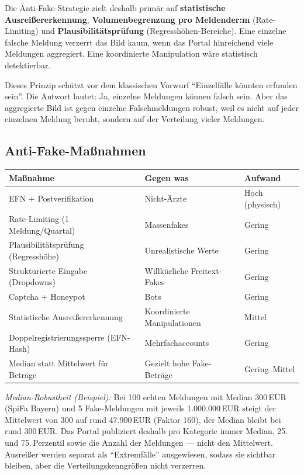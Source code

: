 \documentclass{umbruch-position}
\begin{document}
Die Anti-Fake-Strategie zielt deshalb primär auf \textbf{statistische Ausreißererkennung}, \textbf{Volumenbegrenzung pro Meldender:m} (Rate-Limiting) und \textbf{Plausibilitätsprüfung} (Regresshöhen-Bereiche). Eine einzelne falsche Meldung verzerrt das Bild kaum, wenn das Portal hinreichend viele Meldungen aggregiert. Eine koordinierte Manipulation wäre statistisch detektierbar.

Dieses Prinzip schützt vor dem klassischen Vorwurf ``Einzelfälle könnten erfunden sein''. Die Antwort lautet: Ja, einzelne Meldungen können falsch sein. Aber das aggregierte Bild ist gegen einzelne Falschmeldungen robust, weil es nicht auf jeder einzelnen Meldung beruht, sondern auf der Verteilung vieler Meldungen.

\subsection{Anti-Fake-Maßnahmen}

{\small
\begin{tabularx}{\textwidth}{X X X}
\toprule
\textbf{Maßnahme} & \textbf{Gegen was} & \textbf{Aufwand} \\
\midrule
EFN + Postverifikation & Nicht-Ärzte & Hoch (physisch) \\
Rate-Limiting (1 Meldung/Quartal) & Massenfakes & Gering \\
Plausibilitätsprüfung (Regresshöhe) & Unrealistische Werte & Gering \\
Strukturierte Eingabe (Dropdowns) & Willkürliche Freitext-Fakes & Gering \\
Captcha + Honeypot & Bots & Gering \\
Statistische Ausreißererkennung & Koordinierte Manipulationen & Mittel \\
Doppelregistrierungssperre (EFN-Hash) & Mehrfachaccounts & Gering \\
Median statt Mittelwert für Beträge & Gezielt hohe Fake-Beträge & Gering--Mittel \\
\bottomrule
\end{tabularx}
}

\textit{Median-Robustheit (Beispiel):} Bei 100 echten Meldungen mit Median 300\,EUR (SpiFa Bayern) und 5 Fake-Meldungen mit jeweils 1.000.000\,EUR steigt der Mittelwert von 300 auf rund 47.900\,EUR (Faktor 160), der Median bleibt bei rund 300\,EUR. Das Portal publiziert deshalb pro Kategorie immer Median, 25.\,und 75.\,Perzentil sowie die Anzahl der Meldungen --- nicht den Mittelwert. Ausreißer werden separat als ``Extremfälle'' ausgewiesen, sodass sie sichtbar bleiben, aber die Verteilungskenngrößen nicht verzerren.
\end{document}
